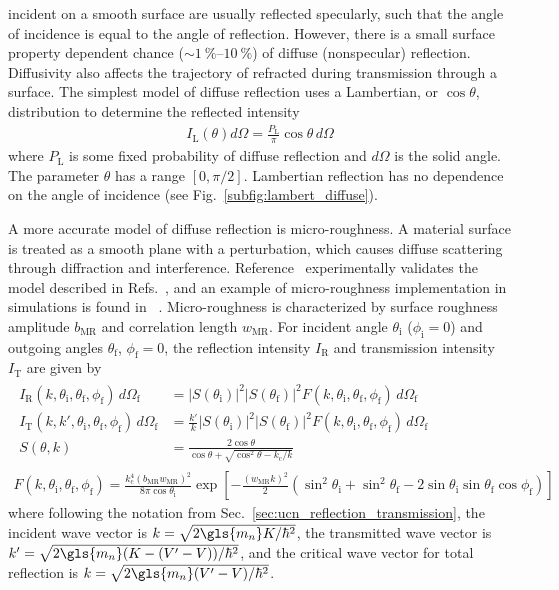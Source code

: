 \ucn incident on a smooth surface are usually reflected specularly, such that the angle of incidence is equal to the angle of reflection. However, there is a small surface property dependent chance ($\sim\qtyrange{1}{10}{\percent}$) of diffuse (nonspecular) reflection. Diffusivity also affects the trajectory of refracted 
\ucn during transmission through a surface. The simplest model of diffuse reflection uses a Lambertian, or $\cos\theta$, distribution to determine the reflected intensity
%
\begin{gather}
    I_\text{L}(\theta)d\Omega=\frac{P_\text{L}}{\pi}\cos\theta\,d\Omega\label{eq:lambertian_reflection}
\end{gather}
%
where $P_\text{L}$ is some fixed probability of diffuse reflection and $d\Omega$ is the solid angle. The parameter $\theta$ has a range $[0,\pi/2]$. Lambertian reflection has no dependence on the angle of incidence (see Fig.~\ref{subfig:lambert_diffuse}).

A more accurate model of diffuse reflection is micro-roughness. A material surface is treated as a smooth plane with a perturbation, which causes diffuse scattering through diffraction and interference. Reference~\cite{atchison_diffuse_2010} experimentally validates the model described in Refs.~\cite{steyerl_1972, steyerl_surface_2010}, and an example of micro-roughness implementation in \ucn simulations is found in \pentrack~\cite{schreyer_pentrack}. Micro-roughness is characterized by surface roughness amplitude $b_\text{MR}$ and correlation length $w_\text{MR}$. For incident angle $\theta_\text{i}$ ($\phi_\text{i}=0$) and outgoing angles $\theta_\text{f}$, $\phi_\text{f}=0$, the reflection intensity $I_\text{R}$ and transmission intensity $I_\text{T}$ are given by~\cite{steyerl_1972, schreyer_thesis}
%
\begin{gather}
    \begin{align}
        I_\text{R}(k, \theta_\text{i}, \theta_\text{f}, \phi_\text{f})\,d\Omega_\text{f} &=  |S(\theta_\text{i})|^2|S(\theta_\text{f})|^2 F(k,\theta_\text{i}, \theta_\text{f}, \phi_\text{f})\,d\Omega_\text{f} \\
        I_\text{T}(k, k', \theta_\text{i}, \theta_\text{f}, \phi_\text{f})\,d\Omega_\text{f} &=  \frac{k'}{k}|S(\theta_\text{i})|^2|S(\theta_\text{f})|^2 F(k,\theta_\text{i}, \theta_\text{f}, \phi_\text{f})\,d\Omega_\text{f} \\
        S(\theta,k) &= \frac{2\cos\theta}{\cos\theta+\sqrt{\cos^2\theta-k_\text{c}/k}}
    \end{align}\\
    F(k,\theta_\text{i}, \theta_\text{f}, \phi_\text{f}) = \frac{k^4_\text{c}(b_\text{MR}w_\text{MR})^2}{8\pi\cos\theta_\text{i}} \exp \left[-\frac{(w_\text{MR}k)^2}{2} (\sin^2\theta_\text{i}+\sin^2\theta_\text{f} - 2\sin\theta_\text{i}\sin\theta_\text{f}\cos\phi_\text{f})\right]
\end{gather}
%
where following the notation from Sec.~\ref{sec:ucn_reflection_transmission}, the incident \ucn wave vector is $k=\sqrt{2\gls{m_n}K/\hbar^2}$, the transmitted wave vector is $k'=\sqrt{2\gls{m_n}(K - (V'-V))/\hbar^2}$, and the critical wave vector for total reflection is $k=\sqrt{2\gls{m_n}(V'-V)/\hbar^2}$.


